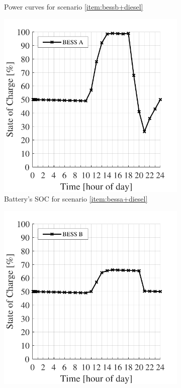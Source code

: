 \documentclass{ieeeaccess}
\begin{document}
\begin{figure}[!h]
\begin{subfigure}{.235\textwidth}
            \caption{Power curves for scenario \ref{item:bessb+diesel} }
            \label{fig:result-power-B}
        \end{subfigure}

        \begin{subfigure}{.235\textwidth}
            \centering
            \includegraphics[width=\linewidth]{figures/residential_nv14_soc.pdf}
            \caption{Battery's SOC for scenario \ref{item:bessa+diesel}}
            \label{fig:result-soc-A}
        \end{subfigure}
        \begin{subfigure}{.235\textwidth}
            \centering
            \includegraphics[width=\linewidth]{figures/residential_8ch33p_soc.pdf}

\end{subfigure}
\end{figure}
\end{document}
